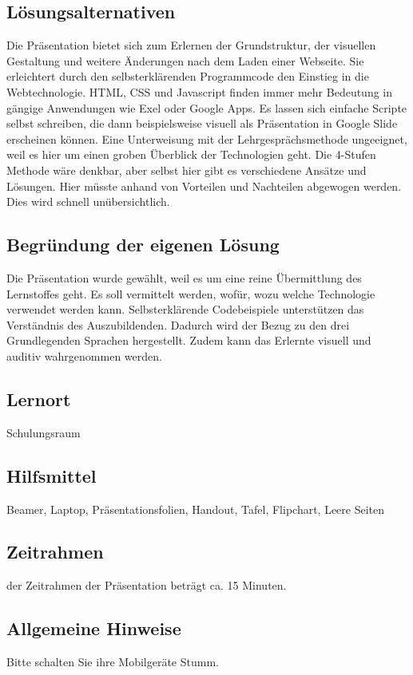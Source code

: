 \documentclass[a4paper, 12pt]{article}
\begin{document}
   	\subsection{Lösungsalternativen}
   	Die Präsentation bietet sich zum Erlernen der Grundstruktur, der visuellen Gestaltung und weitere Änderungen nach dem Laden einer Webseite. Sie erleichtert durch den selbsterklärenden Programmcode den Einstieg in die Webtechnologie. HTML, CSS und Javascript finden immer mehr Bedeutung in gängige Anwendungen wie Exel oder Google Apps. Es lassen sich einfache Scripte selbst schreiben, die dann beispielsweise visuell als Präsentation in Google Slide erscheinen können. Eine Unterweisung mit der Lehrgesprächsmethode ungeeignet, weil es hier um einen groben Überblick der Technologien geht. Die 4-Stufen Methode wäre denkbar, aber selbst hier gibt es verschiedene Ansätze und Lösungen. Hier müsste anhand von Vorteilen und Nachteilen abgewogen werden. Dies wird schnell unübersichtlich.

	\subsection{Begründung der eigenen Lösung}
	Die Präsentation wurde gewählt, weil es um eine reine Übermittlung des Lernstoffes geht. Es soll vermittelt werden, wofür, wozu welche Technologie verwendet werden kann. Selbsterklärende Codebeispiele unterstützen das Verständnis des Auszubildenden. Dadurch wird der Bezug zu den drei Grundlegenden Sprachen hergestellt. Zudem kann das Erlernte visuell und auditiv wahrgenommen werden.
	
   
   \subsection{Lernort}
   	Schulungsraum
   
   \subsection{Hilfsmittel}
   	Beamer, Laptop, Präsentationsfolien, Handout, Tafel, Flipchart, Leere Seiten
   	
   	\subsection{Zeitrahmen}
     der Zeitrahmen der Präsentation beträgt ca. 15 Minuten.
   
	\subsection{Allgemeine Hinweise}
	Bitte schalten Sie ihre Mobilgeräte Stumm.
\end{document}
